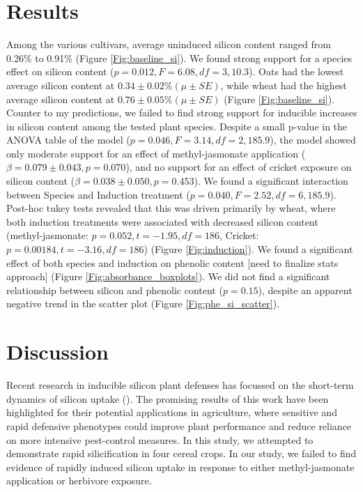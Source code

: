 \documentclass[12pt, letterpaper, ]{report}
\begin{document}
\section{Results}
Among the various cultivars, average uninduced silicon content ranged from 0.26\% to 0.91\% (Figure \ref{Fig:baseline_si}). We found strong support for a species effect on silicon content ($p=0.012, F = 6.08, df=3,10.3$). Oats had the lowest average silicon content at $0.34 \pm 0.02\% (\mu \pm SE)$, while wheat had the highest average silicon content at $0.76 \pm 0.05\% (\mu \pm SE)$ (Figure \ref{Fig:baseline_si}). Counter to my predictions, we failed to find strong support for inducible increases in silicon content among the tested plant species. Despite a small p-value in the ANOVA table of the model ($p = 0.046, F = 3.14, df = 2,185.9$), the model showed only moderate support for an effect of methyl-jasmonate application ($\beta = 0.079 \pm 0.043, p = 0.070$), and no support for an effect of cricket exposure on silicon content ($\beta = 0.038 \pm 0.050, p = 0.453$). We found a significant interaction between Species and Induction treatment ($p = 0.040, F = 2.52, df = 6,185.9$). Post-hoc tukey tests revealed that this was driven primarily by wheat, where both induction treatments were associated with decreased silicon content (methyl-jasmonate: $p = 0.052, t = -1.95, df = 186$, Cricket: $p = 0.00184, t = -3.16, df = 186$) (Figure \ref{Fig:induction}).
We found a significant effect of both species and induction on phenolic content [need to finalize stats approach] (Figure \ref{Fig:absorbance_boxplots}).
We did not find a significant relationship between silicon and phenolic content ($p = 0.15$), despite an apparent negative trend in the scatter plot (Figure \ref{Fig:phe_si_scatter}).

\section{Discussion}

Recent research in inducible silicon plant defenses has focussed on the short-term dynamics of silicon uptake (\cite{waterman_short-term_2021,waterman_short-term_2021-1}). The promising results of this work have been highlighted for their potential applications in agriculture, where sensitive and rapid defensive phenotypes could improve plant performance and reduce reliance on more intensive pest-control measures. In this study, we attempted to demonstrate rapid silicification in four cereal crops. In our study, we failed to find evidence of rapidly induced silicon uptake in response to either methyl-jasmonate application or herbivore exposure. 
\end{document}
